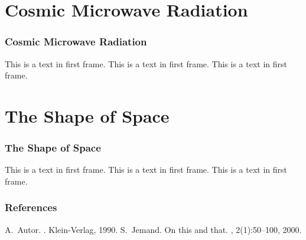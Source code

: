 \documentclass[14pt]{beamer}
\begin{document}
\section{Cosmic Microwave Radiation} %
\begin{frame}
\frametitle{Cosmic Microwave Radiation}
This is a text in first frame. This is a text in first frame. This is a text in first frame.
\end{frame}

\section{The Shape of Space} %
\begin{frame}
\frametitle{The Shape of Space}
This is a text in first frame. This is a text in first frame. This is a text in first frame.
\end{frame}

 \begin{frame}[allowframebreaks]
  \frametitle{References}    
  \begin{thebibliography}{10}    
  \beamertemplatebookbibitems
    A.~Autor.
    .
    \newblock Klein-Verlag, 1990.
  \beamertemplatearticlebibitems
    S.~Jemand.
    \newblock On this and that.
    , 2(1):50--100, 2000.
  \end{thebibliography}
\end{frame}
\end{document}
